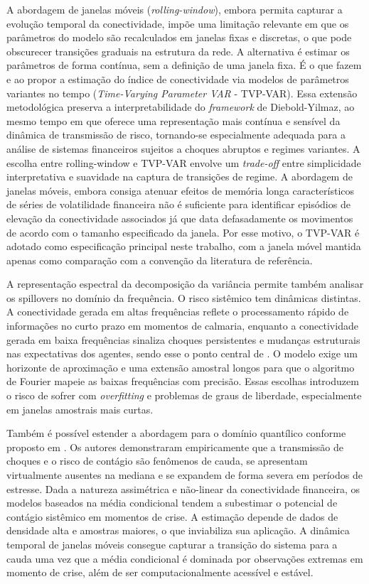 \documentclass[12pt, a4paper, oneside, english, brazil]{abntex2}
\begin{document}
A abordagem de janelas móveis (\textit{rolling-window}), embora permita capturar a
evolução temporal da conectividade, impõe uma limitação relevante em que os parâmetros do
modelo são recalculados em janelas fixas e discretas, o que pode obscurecer transições
graduais na estrutura da rede. A alternativa é estimar os parâmetros de forma contínua,
sem a definição de uma janela fixa. 
É o que fazem \textcite{antonakakis2020} e \textcite{chatziantoniou2021} 
ao propor a estimação do índice de conectividade via
modelos de parâmetros variantes no tempo (\textit{Time-Varying Parameter VAR} - TVP-VAR).
Essa extensão metodológica preserva a interpretabilidade do
\textit{framework} de Diebold-Yilmaz, ao mesmo tempo em que oferece uma representação
mais contínua e sensível da dinâmica de transmissão de risco, tornando-se especialmente
adequada para a análise de sistemas financeiros sujeitos a choques abruptos e regimes
variantes. A escolha entre rolling-window e TVP-VAR envolve um \textit{trade-off} entre
simplicidade interpretativa e suavidade na captura de transições de regime. A abordagem 
de janelas móveis, embora consiga atenuar efeitos de memória longa característicos de séries de 
volatilidade financeira não é suficiente para identificar episódios de elevação da conectividade
associados já que data defasadamente os movimentos de acordo com o tamanho especificado da janela.
Por esse motivo, o TVP-VAR é adotado como especificação principal neste trabalho, com a janela 
móvel mantida apenas como comparação com a convenção da literatura de referência.

A representação espectral da decomposição da variância permite também analisar os spillovers 
no domínio da frequência. O risco sistêmico tem dinâmicas distintas. A conectividade gerada em 
altas frequências reflete o processamento rápido de informações no curto prazo em momentos de 
calmaria, enquanto a conectividade gerada em baixa frequências sinaliza choques persistentes e 
mudanças estruturais nas expectativas dos agentes, sendo esse o ponto central de 
\textcite{barunik2018}. O modelo exige um horizonte de aproximação e uma extensão amostral 
longos para que o algoritmo de Fourier mapeie as baixas frequências com precisão. 
Essas escolhas introduzem o risco de sofrer com \textit{overfitting} e problemas de 
graus de liberdade, especialmente em janelas amostrais mais curtas. 

Também é possível estender a abordagem para o domínio
quantílico conforme proposto em \textcite{ando2022}. Os autores demonstraram empiricamente que 
a transmissão de choques e o risco de contágio são fenômenos de cauda, se apresentam virtualmente
ausentes na mediana e se expandem de forma severa em períodos de estresse. Dada a natureza assimétrica
e não-linear da conectividade financeira, os modelos baseados na média condicional tendem a subestimar
o potencial de contágio sistêmico em momentos de crise. A estimação depende de dados de densidade
alta e amostras maiores, o que inviabiliza sua aplicação. A dinâmica temporal de janelas móveis
consegue capturar a transição do sistema para a cauda uma vez que a média condicional 
é dominada por observações extremas em momento de crise, além de ser computacionalmente acessível
e estável.  
\end{document}
